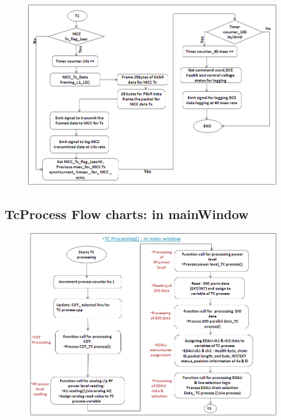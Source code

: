 \begin{figure}[H]
	\centering
	\includegraphics[width=\linewidth]{./FlowCharts/PngFlowCharts/SLOT_100Hz2.png} 
\end{figure}

\subsection{TcProcess Flow charts: in mainWindow}

\begin{figure}[H]
	\centering
	\includegraphics[width=\linewidth]{./FlowCharts/PngFlowCharts/TCP1.png}
\end{figure}

